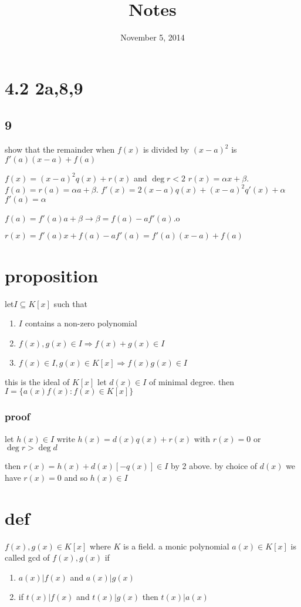 \documentclass[letterpaper]{article}
\begin{document}
\title{Notes}
\date{November 5, 2014}
\maketitle
\section*{4.2 2a,8,9}
\subsection*{9}
show that the remainder when $f(x)$ is divided by $(x-a)^2$ is $f'(a)(x-a)+f(a)$

$f(x)=(x-a)^2q(x)+r(x)$ and $\deg r<2$ $r(x)=\alpha x+\beta$.
$f(a)=r(a)=\alpha a+\beta$.
$f'(x)=2(x-a)q(x)+(x-a)^2q'(x)+\alpha$
$f'(a)=\alpha$

$f(a)=f'(a)a+\beta\to\beta=f(a)-af'(a)$.o

$r(x)=f'(a)x+f(a)-af'(a)=f'(a)(x-a)+f(a)$
\section*{proposition}
let$I\subseteq K[x]$ such that
\begin{enumerate}
\item
$I$ contains a non-zero polynomial
\item
$f(x),g(x)\in I\Rightarrow f(x)+g(x)\in I$
\item
$f(x)\in I, g(x)\in K[x]\Rightarrow f(x)g(x)\in I$
\end{enumerate}
this is the ideal of $K[x]$
let $d(x)\in I$ of minimal degree. then $I=\{a(x)f(x):f(x)\in K[x]\}$

\subsubsection*{proof}
let $h(x)\in I$ write $h(x)=d(x)q(x)+r(x)$ with $r(x)=0$ or $\deg r>\deg d$

then $r(x)=h(x)+d(x)[-q(x)]\in I$ by 2 above. by choice of $d(x)$ we have $r(x)=0$ and so $h(x)\in I$


\section*{def}
$f(x),g(x)\in K[x]$ where $K$ is a field. a monic polynomial $a(x)\in K[x]$ is called gcd of $f(x),g(x)$ if
\begin{enumerate}
\item
$a(x)|f(x)$ and $a(x)|g(x)$
\item
if $t(x)|f(x)$ and $t(x)|g(x)$ then $t(x)|a(x)$
\end{enumerate}
\end{document}
